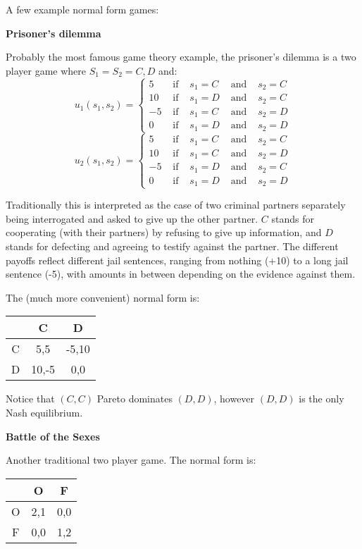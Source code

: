 \documentclass[12pt]{article}
\begin{document}
A few example normal form games:

\textbf{Prisoner's dilemma}

Probably the most famous game theory example, the prisoner's dilemma is a two player game where $S_1=S_2={C,D}$ and:
\begin{displaymath}
u_1(s_1,s_2)=\left\{
\begin{array}{ccccc}
5 &\text{ if } &s_1=C &\text{ and } &s_2=C\\
10 &\text{ if } &s_1=D &\text{ and }& s_2=C\\
-5 &\text{ if } &s_1=C &\text{ and }& s_2=D\\
0 &\text{ if } &s_1=D &\text{ and } &s_2=D
\end{array}\right.
\end{displaymath}
\begin{displaymath}
u_2(s_1,s_2)=\left\{
\begin{array}{ccccc}
5 &\text{ if } &s_1=C &\text{ and } &s_2=C\\
10 &\text{ if }& s_1=C& \text{ and }& s_2=D\\
-5 &\text{ if }& s_1=D& \text{ and }& s_2=C\\
0 &\text{ if } &s_1=D &\text{ and } &s_2=D
\end{array}\right.
\end{displaymath}

Traditionally this is interpreted as the case of two criminal partners separately being interrogated and asked to give up the other partner.  $C$ stands for cooperating (with their partners) by refusing to give up information, and $D$ stands for defecting and agreeing to testify against the partner.  The different payoffs reflect different jail sentences, ranging from nothing (+10) to a long jail sentence (-5), with amounts in between depending on the evidence against them.


The (much more convenient) normal form is:
\begin{tabular}{|c|cc|}
\hline
 &C&D\\
\hline
C&5,5&-5,10\\
D&10,-5&0,0\\
\hline
\end{tabular}

Notice that $(C,C)$ Pareto dominates $(D,D)$, however $(D,D)$ is the only Nash equilibrium.


\textbf{Battle of the Sexes}

Another traditional two player game.  The normal form is:
\begin{tabular}{|c|cc|}
\hline
 &O&F\\
\hline
O&2,1&0,0\\
F&0,0&1,2\\
\hline
\end{tabular}
\end{document}
